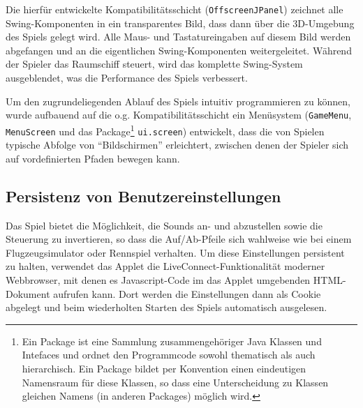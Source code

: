 \documentclass[a4paper,12pt]{scrartcl}
\begin{document}
Die hierfür entwickelte Kompatibilitätsschicht (\texttt{OffscreenJPanel})
zeichnet alle Swing-Komponenten in ein transparentes Bild, dass dann über die 3D-Umgebung des Spiels
gelegt wird. Alle Maus- und Tastatureingaben auf diesem Bild werden abgefangen und an
die eigentlichen Swing-Komponenten weitergeleitet. Während der Spieler das Raumschiff
steuert, wird das komplette Swing-System ausgeblendet, was die Performance des Spiels
verbessert.

Um den zugrundeliegenden Ablauf des Spiels intuitiv programmieren zu können, wurde
aufbauend auf die o.g. Kompatibilitätsschicht ein Menüsystem (\texttt{GameMenu}, \texttt{MenuScreen} und das Package\footnote{Ein Package ist eine Sammlung zusammengehöriger Java Klassen und Intefaces und ordnet den Programmcode sowohl thematisch als auch hierarchisch. Ein Package bildet per Konvention einen eindeutigen Namensraum für diese Klassen, so dass eine Unterscheidung zu Klassen gleichen Namens (in anderen Packages) möglich wird.} \texttt{ui.screen}) entwickelt, dass die von Spielen typische
Abfolge von "`Bildschirmen"' erleichtert, zwischen denen der Spieler sich auf vordefinierten Pfaden
bewegen kann.

\subsection{Persistenz von Benutzereinstellungen}
Das Spiel bietet die Möglichkeit, die Sounds an- und abzustellen sowie die Steuerung zu
invertieren, so dass die Auf/Ab-Pfeile sich wahlweise wie bei einem Flugzeugsimulator oder
Rennspiel verhalten. Um diese Einstellungen persistent zu halten, verwendet das Applet die
LiveConnect-Funktionalität moderner Webbrowser, mit denen es Javascript-Code im das
Applet umgebenden HTML-Dokument aufrufen kann. Dort werden die Einstellungen dann
als Cookie abgelegt und beim wiederholten Starten des Spiels automatisch ausgelesen.
\end{document}
